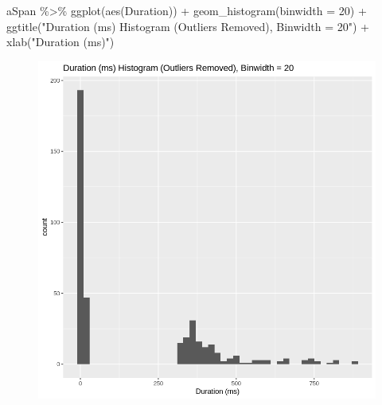 \documentclass[
  letterpaper,
  DIV=11,
  numbers=noendperiod]{scrartcl}
\newenvironment{Shaded}{\begin{snugshade}}{\end{snugshade}}
\newcommand{\AttributeTok}[1]{\textcolor[rgb]{0.40,0.45,0.13}{#1}}
\newcommand{\DecValTok}[1]{\textcolor[rgb]{0.68,0.00,0.00}{#1}}
\newcommand{\FunctionTok}[1]{\textcolor[rgb]{0.28,0.35,0.67}{#1}}
\newcommand{\NormalTok}[1]{\textcolor[rgb]{0.00,0.23,0.31}{#1}}
\newcommand{\SpecialCharTok}[1]{\textcolor[rgb]{0.37,0.37,0.37}{#1}}
\newcommand{\StringTok}[1]{\textcolor[rgb]{0.13,0.47,0.30}{#1}}
\begin{document}
\begin{Shaded}
\begin{Highlighting}[]
\NormalTok{aSpan }\SpecialCharTok{\%\textgreater{}\%}
    \FunctionTok{ggplot}\NormalTok{(}\FunctionTok{aes}\NormalTok{(Duration)) }\SpecialCharTok{+} \FunctionTok{geom\_histogram}\NormalTok{(}\AttributeTok{binwidth =} \DecValTok{20}\NormalTok{) }\SpecialCharTok{+}
    \FunctionTok{ggtitle}\NormalTok{(}\StringTok{"Duration (ms) Histogram (Outliers Removed), Binwidth = 20"}\NormalTok{) }\SpecialCharTok{+}
    \FunctionTok{xlab}\NormalTok{(}\StringTok{"Duration (ms)"}\NormalTok{)}
\end{Highlighting}
\end{Shaded}

\begin{figure}[H]

{\centering \includegraphics{dss-span-analysis-rev5_files/figure-pdf/cell-28-output-1.png}

}

\end{figure}

\begin{Shaded}
\end{Shaded}
\end{document}
